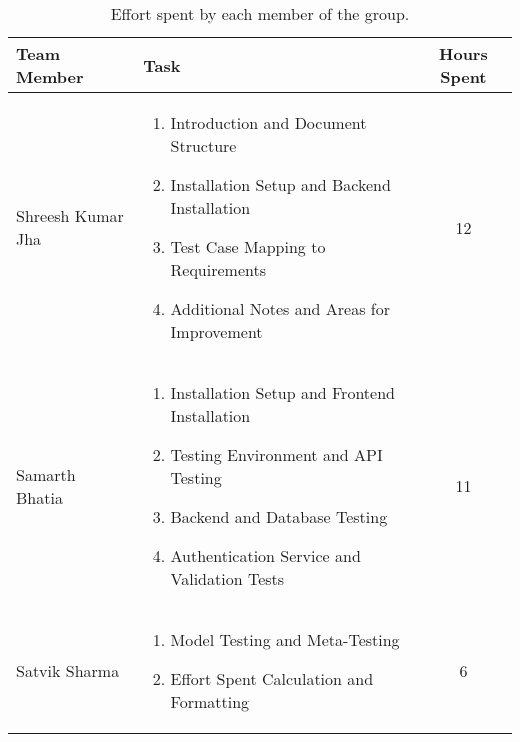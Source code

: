 \begin{table}[H]
    \centering
    \begin{tabular}{|p{}|p{}|c|}
        \hline
        \textbf{Team Member} & \textbf{Task} & \textbf{Hours Spent} \\ 
        \hline
        Shreesh Kumar Jha & 
        \begin{enumerate}
            \item Introduction and Document Structure
            \item Installation Setup and Backend Installation
            \item Test Case Mapping to Requirements
            \item Additional Notes and Areas for Improvement
        \end{enumerate} & 12 \\ 
        \hline
        Samarth Bhatia & 
        \begin{enumerate}
            \item Installation Setup and Frontend Installation
            \item Testing Environment and API Testing
            \item Backend and Database Testing
            \item Authentication Service and Validation Tests
        \end{enumerate} & 11 \\ 
        \hline
        Satvik Sharma & 
        \begin{enumerate}
            \item Model Testing and Meta-Testing
            \item Effort Spent Calculation and Formatting
        \end{enumerate} & 6 \\ 
        \hline
    \end{tabular}
    \caption{Effort spent by each member of the group.}
    \label{tab:effort_spent}
\end{table}
